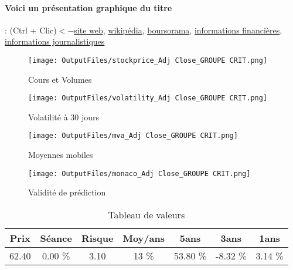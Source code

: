\documentclass[11pt,a4paper]{report}%
\begin{document}
\paragraph{Voici un présentation graphique du titre} : (Ctrl + Clic)$<-$\href{http://www.groupe-crit.com/fr/infos_agenda.php}{site web}, \href{https://fr.wikipedia.org/wiki/Groupe_CRIT}{wikipédia}, \href{https://www.boursorama.com/cours/1rPCEN}{boursorama}, \href{https://www.qwant.com/?q=site:https:%2f%2fwww.easybourse.com%2faction-societe%2fGROUPE-CRIT&t=web&client=ext-firefox-hp}{informations financières}, \href{https://bourse.lerevenu.com/cours-de-bourse/fiche-valeur-synthese/GROUPE-CRIT/CEN-FR}{informations journalistiques}
\begin{figure}[!htb]
   \begin{minipage}{0.5\textwidth}
     \centering
     \texttt{[image: OutputFiles/stockprice\_Adj Close\_GROUPE CRIT.png]}
     \caption{Cours et Volumes}\label{Fig:price_GROUPE CRIT}
   \end{minipage}\hfill
   \begin{minipage}{0.5\textwidth}
     \centering
     \texttt{[image: OutputFiles/volatility\_Adj Close\_GROUPE CRIT.png]}
     \caption{Volatilité à 30 jours}\label{Fig:volat_GROUPE CRIT}
   \end{minipage}
\end{figure}
\begin{figure}[!htb]
   \begin{minipage}{0.5\textwidth}
     \centering
     \texttt{[image: OutputFiles/mva\_Adj Close\_GROUPE CRIT.png]}
     \caption{Moyennes mobiles}\label{Fig:mva_GROUPE CRIT}
   \end{minipage}\hfill
   \begin{minipage}{0.5\textwidth}
     \centering
     \texttt{[image: OutputFiles/monaco\_Adj Close\_GROUPE CRIT.png]}
     \caption{Validité de prédiction}\label{Fig:prediction_GROUPE CRIT}
   \end{minipage}
\end{figure}

\begin{table}[H]
  \centering
    \begin{tabular}{|c|c|c|c|c|c|c|}
    \hline
    Prix & Séance & Risque  & Moy/ans & 5ans & 3ans & 1ans \\
    \hline
    62.40 &    0.00 \%    & 3.10 & 13 \% & 53.80 \% & -8.32 \% & 3.14 \% \\
    \hline
    \end{tabular}%
        \label{tab:table_GROUPE CRIT}%
      \caption{Tableau de valeurs}
\end{table}%
\end{document}
